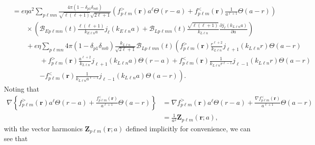 \documentclass{article}
\begin{document}
\begin{equation}
\begin{split}
&= e\eta a^2\sum_{p\ell mn}\frac{4\pi(1 - \delta_{p1}\delta_{m0})}{\sqrt{\ell(\ell + 1)}\sqrt{2\ell + 1}}\left(f_{p\ell m}^>(\mathbf{r})a^\ell\Theta(r - a) + f_{p\ell m}^<(\mathbf{r})\frac{1}{a^{\ell + 1}}\Theta(a - r)\right)\\
&\qquad\times\left(\mathcal{B}_{Ep\ell mn}(t)\frac{\ell(\ell + 1)}{k_{E\ell n}a}j_\ell(k_{E\ell n}a) + \mathcal{B}_{Lp\ell mn}(t)\frac{\sqrt{\ell(\ell + 1)}}{k_{L\ell n}}\frac{\partial j_{\ell}(k_{L\ell n}a)}{\partial a}\right)\\
&\qquad + e\eta\sum_{p\ell mn}4\pi(1 - \delta_{p1}\delta_{m0})\frac{k_{L\ell n}}{\sqrt{2\ell + 1}}\mathcal{B}_{Lp\ell mn}(t)\left(f_{p\ell m}^>(\mathbf{r})\frac{r^{\ell + 2}}{k_{L\ell n}}j_{\ell + 1}(k_{L\ell n}r)\Theta(a - r)\right.\\
&\qquad\qquad + f_{p\ell m}^>(\mathbf{r})\frac{a^{\ell + 2}}{k_{L\ell n}}j_{\ell + 1}(k_{L\ell n}a)\Theta(r - a) + f_{p\ell m}^<(\mathbf{r})\frac{1}{k_{L\ell n}r^{\ell - 1}}j_{\ell - 1}(k_{L\ell n}r)\Theta(a - r)\\
&\qquad\qquad\left. - f_{p\ell m}^<(\mathbf{r})\frac{1}{k_{L\ell n}a^{\ell - 1}}j_{\ell - 1}(k_{L\ell n}a)\Theta(a - r)\right).
\end{split}
\end{equation}
Noting that
\begin{equation}
\begin{split}
\nabla\left\{f_{p\ell m}^>(\mathbf{r})a^\ell\Theta(r - a) + \frac{f_{p\ell m}^<(\mathbf{r})}{a^{\ell + 1}}\Theta(a - r)\right\} &= \nabla f_{p\ell m}^>(\mathbf{r})a^\ell\Theta(r - a) + \frac{\nabla f_{p\ell m}^<(\mathbf{r})}{a^{\ell + 1}}\Theta(a - r)\\
&= \frac{1}{a^2}\mathbf{Z}_{p\ell m}(\mathbf{r};a),
\end{split}
\end{equation}
with the vector harmonics $\mathbf{Z}_{p\ell m}(\mathbf{r};a)$ defined implicitly for convenience, we can see that
\end{document}
